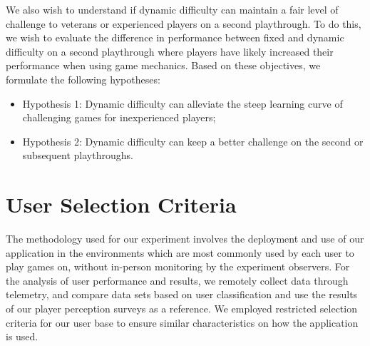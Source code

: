 We also wish to understand if dynamic difficulty can maintain a fair level of challenge to veterans or experienced players on a second playthrough. To do this, we wish to evaluate the difference in performance between fixed and dynamic difficulty on a second playthrough where players have likely increased their performance when using game mechanics. Based on these objectives, we formulate the following hypotheses:
\begin{itemize}
    \item{Hypothesis 1: Dynamic difficulty can alleviate the steep learning curve of challenging games for inexperienced players;}
    \item{Hypothesis 2: Dynamic difficulty can keep a better challenge on the second or subsequent playthroughs.}
\end{itemize}





\section{User Selection Criteria}


The methodology used for our experiment involves the deployment and use of our application in the environments which are most commonly used by each user to play games on, without in-person monitoring by the experiment observers. For the analysis of user performance and results, we remotely collect data through telemetry, and compare data sets based on user classification and use the results of our player perception surveys as a reference. We employed restricted selection criteria for our user base to ensure similar characteristics on how the application is used.

